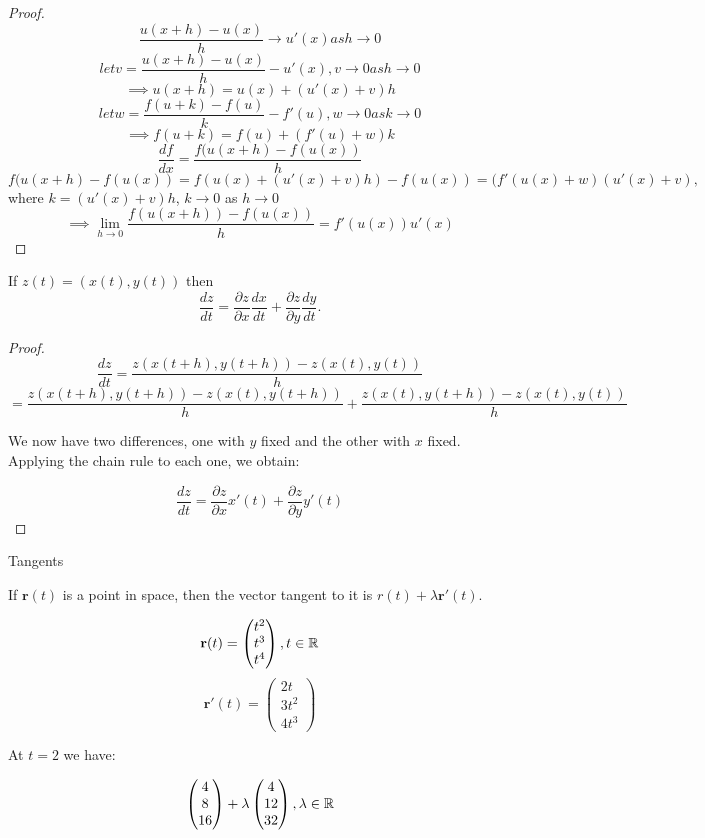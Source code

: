 \documentclass[a4paper,10pt]{article}
\begin{document}
\begin{proof}
	\[ \frac{u(x+h) - u(x)}{h} \to u'(x) as h \to 0 \]
	\[ let v = \frac{u(x+h) - u(x)}{h} - u'(x), v \to 0 as h \to 0 \]
	\[ \implies u(x+h) = u(x) + (u'(x) + v)h \]
	\[ let w = \frac{f(u+k) - f(u)}{k} - f'(u), w \to 0 as k \to 0 \]
	\[ \implies f(u+k) = f(u) + (f'(u) + w)k \]
	\[ \frac{df}{dx} = \frac{f(u(x+h) - f(u(x))}{h} \]
	\[ f(u(x+h) - f(u(x))= f(u(x) + (u'(x)+v)h) - f(u(x))  = (f'(u(x) +
	w)(u'(x) + v), \]
	where $k = (u'(x)+v)h$, $k \to 0$ as $h \to 0$
	\[ \implies \lim_{h \to 0} \frac{f(u(x+h)) - f(u(x))}{h} =
	f'(u(x))u'(x) \]

\end{proof}

\begin{lemma}
	If $z(t) = (x(t), y(t))$ then
	\[ \frac{dz}{dt} = \frac{\partial z}{\partial x}\frac{dx}{dt} +
	\frac{\partial z}{\partial y}\frac{dy}{dt}. \]
\end{lemma}

\begin{proof}
	\[ \frac{dz}{dt} = \frac{z(x(t+h), y(t+h)) - z(x(t), y(t))}{h} \]
	\[ = \frac{z(x(t+h), y(t+h)) - z(x(t), y(t+h))}{h} + \frac{z(x(t),
	y(t+h)) - z(x(t), y(t))}{h} \]

	We now have two differences, one with $y$ fixed and the other with
	$x$ fixed. Applying the chain rule to each one, we obtain:

	\[ \frac{dz}{dt} = \frac{\partial z}{\partial x} x'(t) + \frac{\partial
	z}{\partial y} y'(t) \]
\end{proof}

Tangents

If $\mathbf{r}(t)$ is a point in space, then the vector tangent to it is $r(t) + \lambda
\mathbf{r}'(t)$.

\begin{ex}
	\[
		\mathbf{r}(t) =
		\begin{pmatrix}
			t^2 \\ t^3 \\ t^4
		\end{pmatrix}
		, t \in \mathbb{R}
	\]
	\[
		\mathbf{r}'(t) =
		\begin{pmatrix}
			2t \\ 3t^2 \\ 4t^3
		\end{pmatrix}
	\]

	At $t=2$ we have:

	\[
		\begin{pmatrix}
			4 \\ 8 \\ 16
		\end{pmatrix}
		+ \lambda
		\begin{pmatrix}
			4 \\ 12 \\ 32
		\end{pmatrix}
		, \lambda \in \mathbb{R}
	\]
\end{ex}
\end{document}
